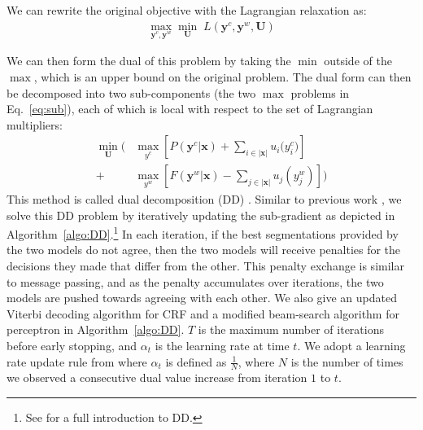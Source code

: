 We can rewrite the original objective with the Lagrangian relaxation as:
\begin{align}
   \max_{\mathbf{y^\textit{c}}, \mathbf{y^\textit{w}}} \min_{\mathbf{U}} \; L\left(\mathbf{y^\textit{c}}, \mathbf{y^\textit{w}}, \mathbf{U}\right)
\end{align}

We can then form the dual of this problem by taking the $\min$ outside of the $\max$, which is an upper bound on the original problem.  
The dual form can then be decomposed into two sub-components (the two $\max$ problems in Eq.~\ref{eq:sub}), each of which is local with respect to the set of Lagrangian multipliers:
\begin{align}
\min_{\mathbf{U}}  \Biggl( & \max_{y^\textit{c}} \left[  P(\mathbf{y^\textit{c}} | \mathbf{x})  + \sum\limits_{i\in |\mathbf{x}|}{u_{i}(y_i^\textit{c}})  \right] \\ \nonumber
 +  &  \max_{y^\textit{w}}   \left[  F(\mathbf{y^\textit{w}} | \mathbf{x})  - \sum\limits_{j\in |\mathbf{x}|}{u_{j}(y_j^\textit{w})}  \right] \Biggr)
\end{align}
This method is called dual decomposition (DD) \cite{Rush:2010:EMNLP}.
Similar to previous work \cite{Rush:2012:JAIR}, we solve this DD problem by iteratively updating the sub-gradient as depicted in Algorithm~\ref{algo:DD}.\footnote{See  for a full introduction to DD.} 
In each iteration, if the best segmentations provided by the two models do not agree, then the two models will receive penalties for the decisions they made that differ from the other. This penalty exchange is similar to message passing, and as the penalty accumulates over iterations, the two models are pushed towards agreeing with each other. 
We also give an updated Viterbi decoding algorithm for CRF and a modified beam-search algorithm for perceptron in Algorithm~\ref{algo:DD}.
$T$ is the maximum number of iterations before early stopping, and $\alpha_t$ is the learning rate at time $t$. We adopt a learning rate update rule from  where $\alpha_t$ is defined as ${\frac{1}{N}}$, where $N$ is the number of times we observed a consecutive dual value increase from iteration $1$ to $t$.
